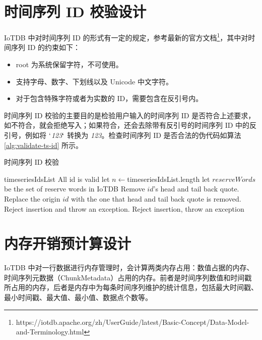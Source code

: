 \section{时间序列 ID 校验设计}
IoTDB 中对时间序列 ID 的形式有一定的规定，参考最新的官方文档\footnote{https://iotdb.apache.org/zh/UserGuide/latest/Basic-Concept/Data-Model-and-Terminology.html}，其中对时间序列 ID 的约束如下：
\begin{itemize}
  \item root 为系统保留字符，不可使用。
  \item 支持字母、数字、下划线以及 Unicode 中文字符。
  \item 对于包含特殊字符或者为实数的 ID，需要包含在反引号内。
\end{itemize}
时间序列 ID 校验的主要目的是检验用户输入的时间序列 ID 是否符合上述要求，如不符合，就会拒绝写入；如果符合，还会去除带有反引号的时间序列 ID 中的反引号，例如将 $`$\emph{123}$`$ 转换为 \emph{123}。检查时间序列 ID 是否合法的伪代码如算法 \ref{alg:validate-ts-id} 所示。
\begin{algorithm}
  \caption{时间序列 ID 校验}
  \label{alg:validate-ts-id}
  \small
  \begin{algorithmic}
    \REQUIRE timeseriesIdsList
    \ENSURE All id is valid
    \STATE let $n \leftarrow $timeseriesIdsList.length
    \STATE let $reserveWords$ be the set of reserve words in IoTDB
      \STATE Remove $id$'s head and tail back quote. 
      \STATE Replace the origin $id$ with the one that head and tail back quote is removed.
      \ELSE
      \STATE Reject insertion and throw an exception.
      \ENDIF
    \STATE Reject insertion, throw an exception
    \ENDIF
    \ENDFOR
    \ENDFOR
  \end{algorithmic}
\end{algorithm}

\section{内存开销预计算设计}
IoTDB 中对一行数据进行内存管理时，会计算两类内存占用：数值占据的内存、时间序列元数据（ChunkMetadata）占用的内存。前者是时间序列数值和时间戳所占用的内存，后者是内存中为每条时间序列维护的统计信息，包括最大时间戳、最小时间戳、最大值、最小值、数据点个数等。

